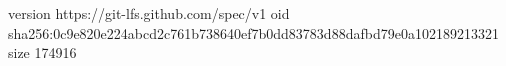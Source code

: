 version https://git-lfs.github.com/spec/v1
oid sha256:0c9e820e224abcd2c761b738640ef7b0dd83783d88dafbd79e0a102189213321
size 174916
